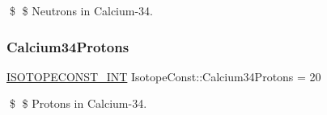 \$ \$ Neutrons in Calcium-\/34. \mbox{\label{group___isotope_const-_calcium-_ca34_ga40ee8809e019728889a64422210d047f}} 
\subsubsection{\texorpdfstring{Calcium34\+Protons}{Calcium34Protons}}
{\footnotesize\ttfamily \mbox{\hyperlink{group___isotope_const-_macros_ga5f18360b3e99483a35c32d789e62621c}{I\+S\+O\+T\+O\+P\+E\+C\+O\+N\+S\+T\+\_\+\+I\+NT}} Isotope\+Const\+::\+Calcium34\+Protons = 20}

\$ \$ Protons in Calcium-\/34. 